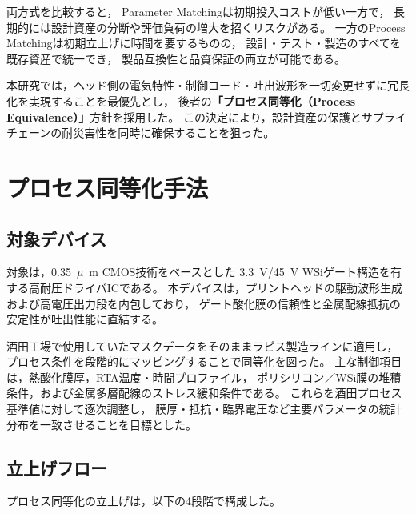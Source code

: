 \documentclass[conference]{IEEEtran}
\newcommand{\micro}{\ensuremath{\mu}}
\begin{document}
両方式を比較すると，
Parameter Matchingは初期投入コストが低い一方で，
長期的には設計資産の分断や評価負荷の増大を招くリスクがある。
一方のProcess Matchingは初期立上げに時間を要するものの，
設計・テスト・製造のすべてを既存資産で統一でき，
製品互換性と品質保証の両立が可能である。

本研究では，ヘッド側の電気特性・制御コード・吐出波形を一切変更せずに冗長化を実現することを最優先とし，
後者の\textbf{「プロセス同等化（Process Equivalence）」}方針を採用した。
この決定により，設計資産の保護とサプライチェーンの耐災害性を同時に確保することを狙った。

\section{プロセス同等化手法}

\subsection{対象デバイス}
対象は，\SI{0.35}{\micro\meter} CMOS技術をベースとした
\SI{3.3}{\volt}/\SI{45}{\volt} WSiゲート構造を有する高耐圧ドライバICである。
本デバイスは，プリントヘッドの駆動波形生成および高電圧出力段を内包しており，
ゲート酸化膜の信頼性と金属配線抵抗の安定性が吐出性能に直結する。

酒田工場で使用していたマスクデータをそのままラピス製造ラインに適用し，
プロセス条件を段階的にマッピングすることで同等化を図った。
主な制御項目は，熱酸化膜厚，RTA温度・時間プロファイル，
ポリシリコン／WSi膜の堆積条件，および金属多層配線のストレス緩和条件である。
これらを酒田プロセス基準値に対して逐次調整し，
膜厚・抵抗・臨界電圧など主要パラメータの統計分布を一致させることを目標とした。

\subsection{立上げフロー}
プロセス同等化の立上げは，以下の4段階で構成した。
\end{document}
